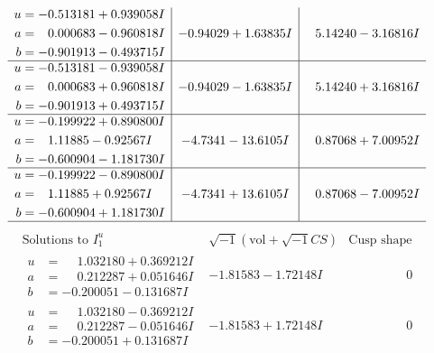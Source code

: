 \documentclass[1p]{elsarticle_modified}
\theoremstyle{definition}
\newcommand{\I}{\sqrt{-1}}
\begin{document}
$$\begin{array}{c|c|c}
\begin{aligned}
u &= -0.513181 + 0.939058 I \\
a &= \phantom{-}0.000683 - 0.960818 I \\
b &= -0.901913 - 0.493715 I\end{aligned}
 & -0.94029 + 1.63835 I & \phantom{-}5.14240 - 3.16816 I \\ \hline\begin{aligned}
u &= -0.513181 - 0.939058 I \\
a &= \phantom{-}0.000683 + 0.960818 I \\
b &= -0.901913 + 0.493715 I\end{aligned}
 & -0.94029 - 1.63835 I & \phantom{-}5.14240 + 3.16816 I \\ \hline\begin{aligned}
u &= -0.199922 + 0.890800 I \\
a &= \phantom{-}1.11885 - 0.92567 I \\
b &= -0.600904 - 1.181730 I\end{aligned}
 & -4.7341 - 13.6105 I & \phantom{-}0.87068 + 7.00952 I \\ \hline\begin{aligned}
u &= -0.199922 - 0.890800 I \\
a &= \phantom{-}1.11885 + 0.92567 I \\
b &= -0.600904 + 1.181730 I\end{aligned}
 & -4.7341 + 13.6105 I & \phantom{-}0.87068 - 7.00952 I\\
 \hline 
 \end{array}$$\newpage$$\begin{array}{c|c|c}  
\text{Solutions to }I^u_{1}& \I (\text{vol} + \sqrt{-1}CS) & \text{Cusp shape}\\
 \hline 
\begin{aligned}
u &= \phantom{-}1.032180 + 0.369212 I \\
a &= \phantom{-}0.212287 + 0.051646 I \\
b &= -0.200051 - 0.131687 I\end{aligned}
 & -1.81583 - 1.72148 I & \phantom{-0.000000 } 0 \\ \hline\begin{aligned}
u &= \phantom{-}1.032180 - 0.369212 I \\
a &= \phantom{-}0.212287 - 0.051646 I \\
b &= -0.200051 + 0.131687 I\end{aligned}
 & -1.81583 + 1.72148 I & \phantom{-0.000000 } 0 \\ \hline\begin{aligned}

\end{aligned}
\end{array}$$
\end{document}
